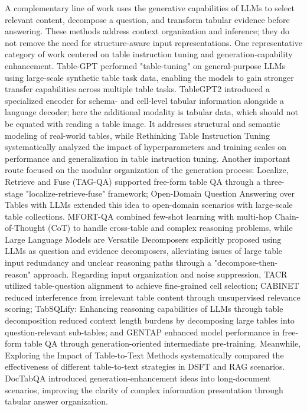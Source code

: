 A complementary line of work uses the generative capabilities of LLMs to select relevant content, decompose a question, and transform tabular evidence before answering. These methods address context organization and inference; they do not remove the need for structure-aware input representations. One representative category of work centered on table instruction tuning and generation-capability enhancement. Table-GPT \cite{peng2023table} performed "table-tuning" on general-purpose LLMs using large-scale synthetic table task data, enabling the models to gain stronger transfer capabilities across multiple table tasks. TableGPT2 \cite{su2024tablegpt2} introduced a specialized encoder for schema- and cell-level tabular information alongside a language decoder; here the additional modality is tabular data, which should not be equated with reading a table image. It addresses structural and semantic modeling of real-world tables, while Rethinking Table Instruction Tuning \cite{deng2025rethinking} systematically analyzed the impact of hyperparameters and training scales on performance and generalization in table instruction tuning. Another important route focused on the modular organization of the generation process: Localize, Retrieve and Fuse (TAG-QA) \cite{zhao2023localize} supported free-form table QA through a three-stage "localize-retrieve-fuse" framework; Open-Domain Question Answering over Tables with LLMs \cite{liang2024open} extended this idea to open-domain scenarios with large-scale table collections. MFORT-QA \cite{guan2024mfort} combined few-shot learning with multi-hop Chain-of-Thought (CoT) to handle cross-table and complex reasoning problems, while Large Language Models are Versatile Decomposers \cite{ye2023large} explicitly proposed using LLMs as question and evidence decomposers, alleviating issues of large table input redundancy and unclear reasoning paths through a "decompose-then-reason" approach. Regarding input organization and noise suppression, TACR \cite{wu2024table} utilized table-question alignment to achieve fine-grained cell selection; CABINET \cite{patnaik2024cabinet} reduced interference from irrelevant table content through unsupervised relevance scoring; TabSQLify: Enhancing reasoning capabilities of LLMs through table decomposition \cite{nahid2024tabsqlify} reduced context length burdens by decomposing large tables into question-relevant sub-tables; and GENTAP \cite{shi2022generation} enhanced model performance in free-form table QA through generation-oriented intermediate pre-training. Meanwhile, Exploring the Impact of Table-to-Text Methods \cite{min2024exploring} systematically compared the effectiveness of different table-to-text strategies in DSFT and RAG scenarios. DocTabQA \cite{wang2024doctabqa} introduced generation-enhancement ideas into long-document scenarios, improving the clarity of complex information presentation through tabular answer organization.

